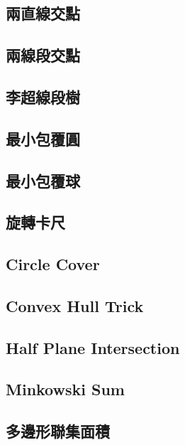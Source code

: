 \documentclass[a4paper,10pt,twocolumn,oneside]{article}
\begin{document}
\subsection{兩直線交點}

\subsection{兩線段交點}

\subsection{李超線段樹}

\subsection{最小包覆圓}

\subsection{最小包覆球}

\subsection{旋轉卡尺}

\subsection{Circle Cover }

\subsection{Convex Hull Trick}

\subsection{Half Plane Intersection}

\subsection{Minkowski Sum}

\subsection{多邊形聯集面積}

%
\end{document}
